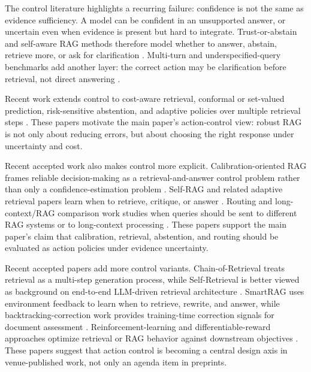 \documentclass[11pt]{article}
\begin{document}
The control literature highlights a recurring failure: confidence is not the same as evidence sufficiency. A model can be confident in an unsupported answer, or uncertain even when evidence is present but hard to integrate. Trust-or-abstain and self-aware RAG methods therefore model whether to answer, abstain, retrieve more, or ask for clarification \citep{rrag002,rrag006,rrag041,rrag064,rrag066,rrag074,rrag075,rrag087,rrag095,rrag105,rrag108}. Multi-turn and underspecified-query benchmarks add another layer: the correct action may be clarification before retrieval, not direct answering \citep{rrag141,rrag146,rrag153}.

Recent work extends control to cost-aware retrieval, conformal or set-valued prediction, risk-sensitive abstention, and adaptive policies over multiple retrieval steps \citep{rrag159,rrag164,rrag167,rrag169,rrag173,rrag178,rrag186,rrag191,rrag192,rrag198,rrag205,rrag228}. These papers motivate the main paper's action-control view: robust RAG is not only about reducing errors, but about choosing the right response under uncertainty and cost.

Recent accepted work also makes control more explicit. Calibration-oriented RAG frames reliable decision-making as a retrieval-and-answer control problem rather than only a confidence-estimation problem \citep{venueAcc003}. Self-RAG and related adaptive retrieval papers learn when to retrieve, critique, or answer \citep{venueAcc016}. Routing and long-context/RAG comparison work studies when queries should be sent to different RAG systems or to long-context processing \citep{rrag039,venueAcc028,venueAcc030}. These papers support the main paper's claim that calibration, retrieval, abstention, and routing should be evaluated as action policies under evidence uncertainty.

Recent accepted papers add more control variants. Chain-of-Retrieval treats retrieval as a multi-step generation process, while Self-Retrieval is better viewed as background on end-to-end LLM-driven retrieval architecture \citep{venueAcc010,venueExtra001}. SmartRAG uses environment feedback to learn when to retrieve, rewrite, and answer, while backtracking-correction work provides training-time correction signals for document assessment \citep{venueExtra010,venueExtra011}. Reinforcement-learning and differentiable-reward approaches optimize retrieval or RAG behavior against downstream objectives \citep{venueExtra016,venueExtra006}. These papers suggest that action control is becoming a central design axis in venue-published work, not only an agenda item in preprints.
\end{document}
